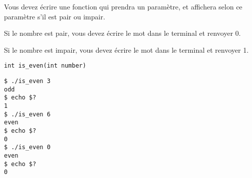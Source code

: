 

%
%

\vspace{0.7cm}

\noindent {}

\bigskip

\noindent Vous devez écrire une fonction qui prendra un paramètre, et affichera selon ce paramètre s'il est pair ou impair.

\noindent Si le nombre est pair, vous devez écrire le mot  dans le terminal et renvoyer 0.

\noindent Si le nombre est impair, vous devez écrire le mot  dans le terminal et renvoyer 1.

\bigskip

\lstset{language=C}
\begin{lstlisting}[frame=single,title={Prototype de la fonction}]
int is_even(int number)
\end{lstlisting}

\bigskip

\lstset{language=sh}
\begin{lstlisting}[frame=single,title={Cas général}]
$ ./is_even 3
odd
$ echo $?
1
$ ./is_even 6
even
$ echo $?
0
$ ./is_even 0
even
$ echo $?
0
\end{lstlisting}
